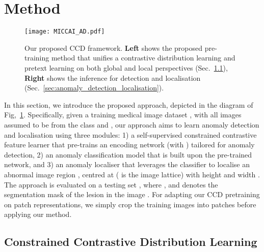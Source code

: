 \documentclass[runningheads]{llncs}
\begin{document}
\section{Method}


\begin{figure}
\begin{center}
\texttt{[image: MICCAI\_AD.pdf]}
\end{center}
\caption{Our proposed CCD framework. \textbf{Left} shows the proposed pre-training method that unifies a contrastive distribution learning and pretext learning on both global and local perspectives (Sec.~\ref{sec:contrastive_and_pretext}),  \textbf{Right} shows the inference for detection and localisation (Sec.~\ref{sec:anomaly_detection_localisation}).}
   
\label{fig:framework}
\end{figure}

In this section, we introduce the proposed approach, depicted in the diagram of Fig,~\ref{fig:framework}. 
Specifically, given a training medical image dataset , 
with all images assumed to be from the  class and , our approach aims to learn anomaly detection and localisation using three modules: 1) a self-supervised constrained contrastive feature learner that pre-trains an encoding network  (with ) tailored for anomaly detection, 2) an anomaly classification model  that is built upon the pre-trained network, and 3) an anomaly localiser that leverages the classifier  to localise an abnormal image region , centred at  ( is the image lattice) with height  and width . 
The approach is evaluated on a testing set , where , and  denotes the segmentation mask of the lesion in the image . For adapting our CCD pretraining on patch representations, we simply crop the training images into patches before applying our method. 





\subsection{Constrained Contrastive Distribution Learning}
\label{sec:contrastive_and_pretext}
\end{document}
